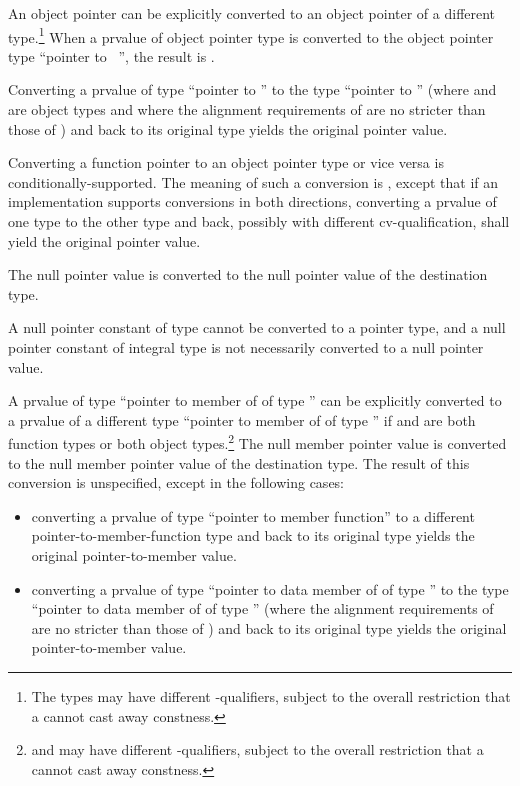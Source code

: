 \pnum
An object pointer
can be explicitly converted to an object pointer of a different type.\footnote{The
types may have different \cv-qualifiers, subject to
the overall
restriction that a  cannot cast away constness.}
When a prvalue  of object pointer type is converted to
the object pointer type ``pointer to \cv{}~'', the result is .
\begin{note}
Converting a prvalue of type ``pointer to '' to
the type ``pointer to '' (where  and  are
object types and where the alignment requirements of  are no
stricter than those of ) and back to its original type yields
the original pointer value.
\end{note}

\pnum
Converting a function pointer to an object pointer
type or vice versa is
conditionally-supported. The meaning of such a conversion is
,
except that if an implementation
supports conversions in both directions, converting a prvalue of one type to the other
type and back, possibly with different cv-qualification, shall yield the original
pointer value.

\pnum
The null pointer value is converted to the null pointer value
of the destination type.
\begin{note}
A null pointer constant of type  cannot be converted to a
pointer type, and a null pointer constant of integral type is not necessarily
converted to a null pointer value.
\end{note}

\pnum
{}%
%
A prvalue of type ``pointer to member of  of type ''
can be explicitly converted to a prvalue of a different type ``pointer to member of
 of type '' if  and  are both
function types or both object types.\footnote{ and  may have
different \cv-qualifiers, subject to
the overall restriction that a  cannot cast away
constness.} The null member pointer value is converted to the
null member pointer value of the destination type. The result of this
conversion is unspecified, except in the following cases:

\begin{itemize}
\item converting a prvalue of type ``pointer to member function'' to a
different pointer-to-member-function type and back to its original type
yields the original pointer-to-member value.

\item converting a prvalue of type ``pointer to data member of 
of type '' to the type ``pointer to data member of 
of type '' (where the alignment requirements of  are
no stricter than those of ) and back to its original type
yields the original pointer-to-member value.
\end{itemize}

